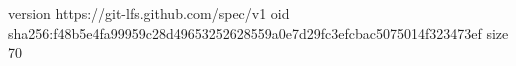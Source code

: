 version https://git-lfs.github.com/spec/v1
oid sha256:f48b5e4fa99959c28d49653252628559a0e7d29fc3efcbac5075014f323473ef
size 70
